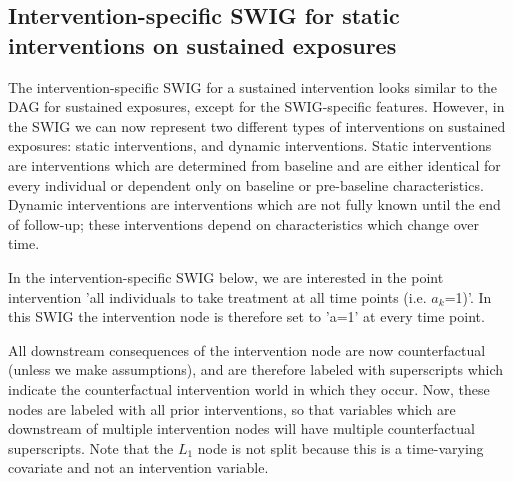 \documentclass[a4paper]{report}
\begin{document}
\vspace{3mm}

\subsection{Intervention-specific SWIG for static interventions on sustained exposures}

The intervention-specific SWIG for a sustained intervention looks similar to the DAG for sustained exposures, except for the SWIG-specific features. However, in the SWIG we can now represent two different types of interventions on sustained exposures: static interventions, and dynamic interventions. Static interventions are interventions which are determined from baseline and are either identical for every individual or dependent only on baseline or pre-baseline characteristics. Dynamic interventions are interventions which are not fully known until the end of follow-up; these interventions depend on characteristics which change over time. 

In the intervention-specific SWIG below, we are interested in the point intervention 'all individuals to take treatment at all time points (i.e. $a_k$=1)'. In this SWIG the intervention node is therefore set to 'a=1' at every time point. 

All downstream consequences of the intervention node are now counterfactual (unless we make assumptions), and are therefore labeled with superscripts which indicate the counterfactual intervention world in which they occur. Now, these nodes are labeled with all prior interventions, so that variables which are downstream of multiple intervention nodes will have multiple counterfactual superscripts. Note that the $L_1$ node is not split because this is a time-varying covariate and not an intervention variable.

\vspace{3mm}
\end{document}
